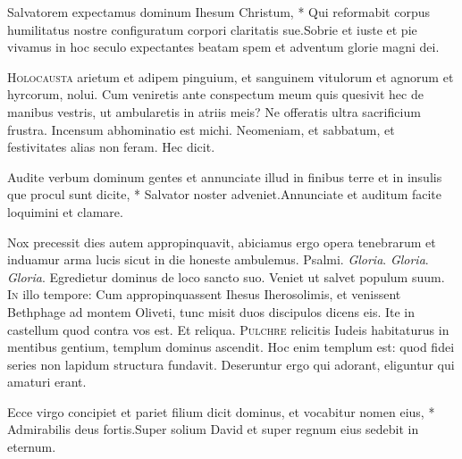 \begin{multicols*}{2}
\begin{responsory}
{Salvatorem expectamus dominum Ihesum Christum, * Qui reformabit corpus humilitatus nostre configuratum corpori claritatis sue.}{Sobrie et iuste et pie vivamus in hoc seculo expectantes beatam spem et adventum glorie magni dei.}
\end{responsory}
\lettrine[lines=2]{\zallmancaps \color{Red} H}{olocausta} arietum et adipem pinguium, et sanguinem vitulorum et agnorum et hyrcorum, nolui. Cum veniretis ante conspectum meum quis quesivit hec de manibus vestris, ut ambularetis in atriis meis? Ne offeratis ultra sacrificium frustra. Incensum abhominatio est michi. Neomeniam, et sabbatum, et festivitates alias non feram. Hec dicit.
\begin{responsory-doxology}
{Audite verbum dominum gentes et annunciate illud in finibus terre et in insulis que procul sunt dicite, * Salvator noster adveniet.}{Annunciate et auditum facite loquimini et clamare.}
\end{responsory-doxology}
 Nox precessit dies autem appropinquavit, abiciamus ergo opera tenebrarum et induamur arma lucis sicut in die honeste ambulemus. {\color{Red} Psalmi.}
 \textit{Gloria}.
 \textit{Gloria}.
 \textit{Gloria}. \V Egredietur dominus de loco sancto suo. \R Veniet ut salvet populum suum.
\lettrine[lines=2]{\zallmancaps \color{Blue} I}{n} illo tempore: Cum appropinquassent Ihesus Iherosolimis, et venissent Bethphage ad montem Oliveti, tunc misit duos discipulos dicens eis. Ite in castellum quod contra vos est. Et reliqua.
\lettrine[lines=2]{\zallmancaps \color{Red} P}{ulchre} relicitis Iudeis habitaturus in mentibus gentium, templum dominus ascendit. Hoc enim templum est: quod fidei series non lapidum structura fundavit. Deseruntur ergo qui adorant, eliguntur qui amaturi erant.
\begin{responsory}
{Ecce virgo concipiet et pariet filium dicit dominus, et vocabitur nomen eius, * Admirabilis deus fortis.}{Super solium David et super regnum eius sedebit in eternum.}

\end{responsory}
\end{multicols*}
